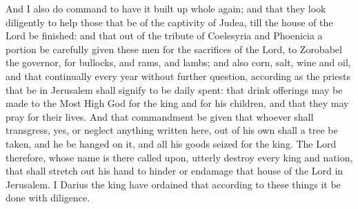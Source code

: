 {And I also do command to have it built up whole again; and that they look diligently to help those that be of the captivity of Judea, till the house of the Lord be finished:
and that out of the tribute of Coelesyria and Phoenicia a portion be carefully given these men for the sacrifices of the Lord,
{} to Zorobabel the governor, for bullocks, and rams, and lambs;
and also corn, salt, wine and oil, and that continually every year without further question, according as the priests that be in Jerusalem shall signify to be daily spent:
that drink offerings may be made to the Most High God for the king and for his children, and that they may pray for their lives.
And that commandment be given that whoever shall transgress, yes, or neglect anything
 written here, out of his own
{} shall a tree be taken, and he be hanged on it, and all his goods seized for the king.
The Lord therefore, whose name is there called upon, utterly destroy every king and nation, that shall stretch out his hand to hinder or endamage that house of the Lord in Jerusalem.
I Darius the king have ordained that according to these things it be done with diligence.

}
